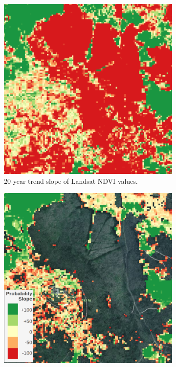 \begin{figure}[H]
\begin{subfigure}[t]{0.24\textwidth}
        \includegraphics[width=\linewidth,height=\linewidth]{figs_06/brocken_ndvi_slope.png}
        \caption{20-year trend slope of Landsat NDVI values.}
        \label{fig:brocken_ndvi}
        \end{subfigure}
        \hfill
        \begin{subfigure}[t]{0.24\textwidth}
        \centering
        \includegraphics[width=\linewidth,height=\linewidth]{figs_06/brocken_pslope.png}

\end{subfigure}
\end{figure}
